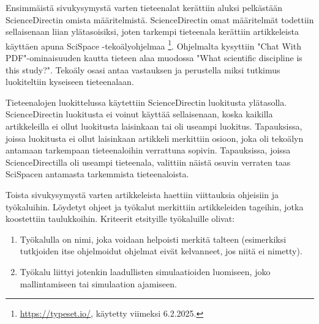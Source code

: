 \documentclass[utf8]{gradu3}
\begin{document}
Ensimmäistä sivukysymystä varten tieteenalat kerättiin aluksi 
pelkästään ScienceDirectin omista määritelmistä. 
ScienceDirectin omat määritelmät todettiin sellaisenaan liian ylätasoisiksi, 
joten tarkempi tieteenala kerättiin artikkeleista käyttäen apuna 
SciSpace -tekoälyohjelmaa \footnote{\url{https://typeset.io/}, käytetty viimeksi 6.2.2025.}. 
Ohjelmalta kysyttiin "Chat With PDF"-ominaisuuden 
kautta tieteen alaa muodossa "What scientific discipline is this study?". 
Tekoäly osasi antaa vastauksen ja perustella miksi tutkimus luokiteltiin kyseiseen tieteenalaan.

\begin{table}[h]
\centering
{}
\caption{Testauserän kategoriat}
\label{table: testausera}
\end{table}

Tieteenalojen luokittelussa käytettiin ScienceDirectin luokitusta ylätasolla.
ScienceDirectin luokitusta ei voinut käyttää sellaisenaan, koska kaikilla artikkeleilla ei ollut luokitusta laisinkaan tai oli useampi luokitus. Tapauksissa, joissa luokitusta ei ollut laisinkaan artikkeli merkittiin osioon,
joka oli tekoälyn antamaan tarkempaan tieteenaloihin verrattuna sopivin.
Tapauksissa, joissa ScienceDirectilla oli useampi tieteenala, valittiin näistä
osuvin verraten taas SciSpacen antamasta tarkemmista tieteenaloista.

Toista sivukysymystä varten artikkeleista haettiin viittauksia ohjeisiin ja työkaluihin. Löydetyt ohjeet ja työkalut merkittiin artikkeleiden tageihin, jotka koostettiin taulukkoihin.
Kriteerit etsityille työkaluille olivat:
\begin{enumerate}
    \item Työkalulla on nimi, joka voidaan helpoisti merkitä talteen (esimerkiksi tutkjoiden itse ohjelmoidut ohjelmat eivät kelvanneet, jos niitä ei nimetty).
    \item Työkalu liittyi jotenkin laadullisten simulaatioiden luomiseen, joko
    mallintamiseen tai simulaation ajamiseen.
\end{enumerate}
\end{document}
